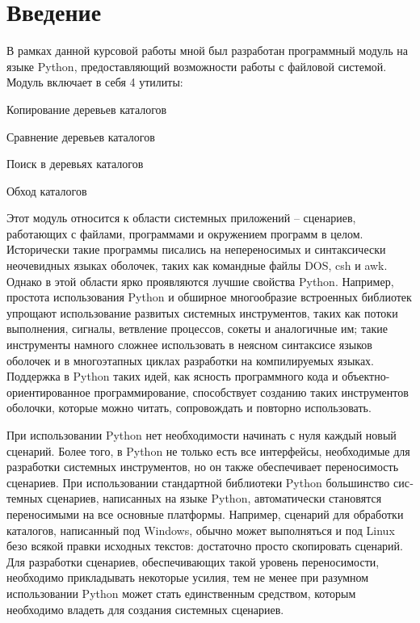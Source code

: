 \documentclass[12pt]{article}
\begin{document}
\pagestyle{plain}
\tableofcontents
\newpage
\section{Введение}
В рамках данной курсовой работы мной был разработан программный модуль на языке Python, предоставляющий возможности работы с файловой системой. Модуль включает в себя 4 утилиты:
\begin{list}{-}{}
\item Копирование деревьев каталогов
\item Сравнение деревьев каталогов
\item Поиск в деревьях каталогов
\item Обход каталогов
\end{list}
 Этот модуль относится к области системных приложений – сценариев, работающих с файлами, программами и окружением
программ в целом.
Исторически такие программы писались на непереносимых и синтаксически неочевидных
языках оболочек, таких как командные файлы DOS, csh и awk.
Однако в этой области ярко проявляются лучшие свойства Python. Например, простота использования Python и обширное многообразие встроенных биб­лиотек упрощают использование развитых сис­темных инструментов, таких как потоки выполнения, сигналы, ветвление процессов, сокеты и аналогичные им; такие инструменты намного сложнее использовать в неясном синтаксисе языков оболочек и в многоэтапных циклах разработки на компилируемых языках. Поддержка в Python таких идей, как ясность программного кода и объектно-ориентированное программирование, способствует созданию таких инструментов оболочки, которые можно читать, сопровождать и повторно использовать. 

При использовании Python нет необходимости начинать с нуля каждый новый сценарий.
Более того, в Python не только есть все интерфейсы, необходимые для разработки сис­темных инструментов, но он также обеспечивает переносимость сценариев. При использовании стандартной биб­лиотеки Python большинство сис­темных сценариев, написанных на языке Python, автоматически становятся переносимыми на все основные платформы. Например, сценарий для обработки каталогов, написанный под Windows, обычно может выполняться и под Linux безо всякой правки исходных текстов: достаточно просто скопировать сценарий. Для разработки сценариев, обеспечивающих такой уровень переносимости, необходимо прикладывать некоторые усилия, тем не
менее при разумном использовании Python может стать единственным средством, которым необходимо владеть для создания сис­темных сценариев.
\end{document}
